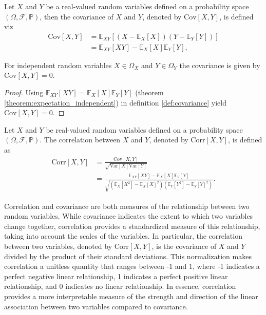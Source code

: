 \begin{definition}[Covariance]
	\label{def:covariance}
	Let $X$ and $Y$ be a real-valued random variables defined on a probability space $(\Omega, \mathcal{F},\mathbb{P})$, then the covariance of $X$ and $Y$, denoted by $\text{Cov}[X,Y]$, is defined viz
	\begin{equation}
		\begin{split}
			\text{Cov}[X,Y]&=\mathbb{E}_{XY}[(X-\mathbb{E}_X[X])(Y-\mathbb{E}_Y[Y])]\\
			&=\mathbb{E}_{XY}[XY]-\mathbb{E}_X[X]\mathbb{E}_Y[Y],
		\end{split}
	\end{equation}
\end{definition}
\begin{theorem}
	\label{theorem:covariance_of_independent_variables}
	For independent random variables $X\in \Omega_X$ and $Y\in \Omega_Y$ the covariance is given by $\text{Cov}[X,Y]=0$.
\end{theorem}
\begin{proof}
	Using $\mathbb{E}_{XY}[XY]=\mathbb{E}_X[X]\mathbb{E}_Y[Y]$ (theorem \ref{theorem:expectation_independent}) in definition \ref{def:covariance} yield $\text{Cov}[X,Y]=0$.
\end{proof}


\begin{definition}[Correlation]
	Let $X$ and $Y$ be real-valued random variables defined on a probability space $(\Omega, \mathcal{F},\mathbb{P})$. The correlation between $X$ and $Y$, denoted by $\text{Corr}[X,Y]$, is defined as
	\begin{equation}
		\begin{split}
			\text{Corr}[X,Y] &= \frac{\text{Cov}[X,Y]}{\sqrt{\text{Var}[X]  \text{Var}[Y]}} \\
			&= \frac{\mathbb{E}_{XY}[XY]-\mathbb{E}_X[X]\mathbb{E}_Y[Y]}{\sqrt{\left(\mathbb{E}_X[X^2] - \mathbb{E}_X[X]^2\right) \left(\mathbb{E}_Y[Y^2] - \mathbb{E}_Y[Y]^2\right)}}.
		\end{split}
	\end{equation}
\end{definition}

Correlation and covariance are both measures of the relationship between two random variables. While covariance indicates the extent to which two variables change together, correlation provides a standardized measure of this relationship, taking into account the scales of the variables. In particular, the correlation between two variables, denoted by $\text{Corr}[X, Y]$, is the covariance of $X$ and $Y$ divided by the product of their standard deviations. This normalization makes correlation a unitless quantity that ranges between -1 and 1, where -1 indicates a perfect negative linear relationship, 1 indicates a perfect positive linear relationship, and 0 indicates no linear relationship. In essence, correlation provides a more interpretable measure of the strength and direction of the linear association between two variables compared to covariance.

